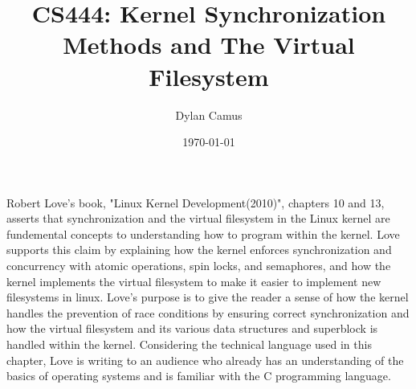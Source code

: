 \documentclass[letterpaper,10pt]{article}
\title{CS444: Kernel Synchronization Methods and The Virtual Filesystem}
\author{Dylan Camus}
\date{\today}
\begin{document}
\maketitle
Robert Love's book, "Linux Kernel Development(2010)", chapters 10 and 13, asserts that synchronization and the virtual filesystem in the Linux kernel are fundemental concepts to understanding how to program within the kernel. Love supports this claim by explaining how the kernel enforces synchronization and concurrency with atomic operations, spin locks, and semaphores, and how the kernel implements the virtual filesystem to make it easier to implement new filesystems in linux. Love's purpose is to give the reader a sense of how the kernel handles the prevention of race conditions by ensuring correct synchronization and how the virtual filesystem and its various data structures and superblock is handled within the kernel. Considering the technical language used in this chapter, Love is writing to an audience who already has an understanding of the basics of operating systems and is familiar with the C programming language.
\end{document}
